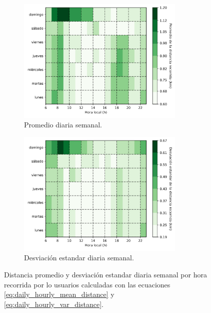 \begin{figure}[H]
    \centering
    \begin{subfigure}[b]{8cm}
        \includegraphics[width=8cm]{Graphics/daily_and_hour_mean_distance.png}
        \caption{Promedio diaria semanal.}
        \label{fig:daily_hourly_mean_distance}
    \end{subfigure}
    \begin{subfigure}[b]{8cm}
        \includegraphics[width=8cm]{Graphics/daily_and_hour_var_distance.png}
        \caption{Desviación estandar diaria semanal.}
        \label{fig:daily_hourly_var_distance}
    \end{subfigure}
    \caption{Distancia promedio y desviación estandar diaria semanal por hora recorrida por lo usuarios calculadas con las ecuaciones \ref{eq:daily_hourly_mean_distance} y \ref{eq:daily_hourly_var_distance}.}
\end{figure}

